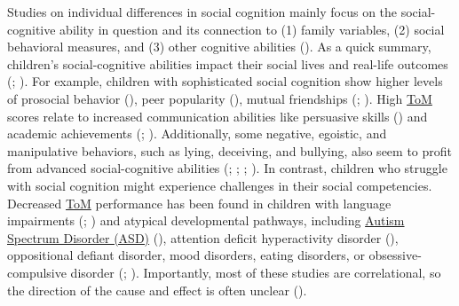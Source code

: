 \documentclass[
]{scrbook}
\begin{document}
Studies on individual differences in social cognition mainly focus on the social-cognitive ability in question and its connection to (1) family variables, (2) social behavioral measures, and (3) other cognitive abilities (). As a quick summary, children's social-cognitive abilities impact their social lives and real-life outcomes (; ). For example, children with sophisticated social cognition show higher levels of prosocial behavior (), peer popularity (), mutual friendships (; ). High \hyperref[acronyms_ToM]{ToM} scores relate to increased communication abilities like persuasive skills () and academic achievements (; ). Additionally, some negative, egoistic, and manipulative behaviors, such as lying, deceiving, and bullying, also seem to profit from advanced social-cognitive abilities (; ; ; ). In contrast, children who struggle with social cognition might experience challenges in their social competencies. Decreased \hyperref[acronyms_ToM]{ToM} performance has been found in children with language impairments (; ) and atypical developmental pathways, including \hyperref[acronyms_ASD]{Autism Spectrum Disorder (ASD)} (), attention deficit hyperactivity disorder (), oppositional defiant disorder, mood disorders, eating disorders, or obsessive-compulsive disorder (; ). Importantly, most of these studies are correlational, so the direction of the cause and effect is often unclear ().
\end{document}
